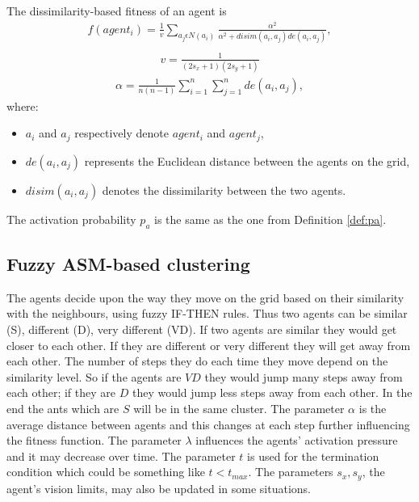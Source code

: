 \begin{definition}
\label{def:fitour}
The dissimilarity-based fitness of an agent is
\begin{align} 
f(agent_i)=\frac{1}{v} \sum_{a_j \epsilon N(a_i)} \frac{\alpha^2}{\alpha^2+ disim(a_i,a_j)de(a_i,a_j)},\\
 \end{align}
\begin{align}
v=\frac{1}{(2s_x + 1) (2s_y + 1)}
\end{align}
\begin{align}
\label{rel:alpha1}
\alpha=\frac{1}{n(n-1)} \sum_{i=1}^{n} \sum_{j=1}^{n} de(a_i,a_j),
\end{align}  
 where:
 \begin{itemize}
\item   $a_i$ and $a_j$ respectively denote $agent_i$ and $agent_j$,
\item $de(a_i,a_j) $  represents the Euclidean distance between the agents on the grid, 
\item $disim(a_i,a_j)$  denotes the dissimilarity between the two agents. 
\end{itemize}
\end{definition}

The activation probability $p_{a}$ is the same as the one from Definition \ref{def:pa}.


\subsection{Fuzzy ASM-based clustering}
\label{sec:fuzzyasmclustering}

The agents decide upon the way they move on the grid based on their similarity with the neighbours, using fuzzy IF-THEN rules. Thus two agents can be similar (S), different (D), very different (VD). If two agents are similar they would get closer to each other. If they are different or very different they will get away from each other. The number of steps they do each time they move depend on the similarity level. So if the agents are $VD$ they would jump many steps away from each other; if they are $D$ they would jump less steps away from each other. In the end the ants which are $S$ will be in the same cluster. The parameter $\alpha$ is the average distance  between agents and this changes at each step further influencing the fitness function. The parameter $\lambda$ influences the agents' activation pressure and it may decrease over time. The parameter $t$ is used for the  termination condition which could be something like \begin{math} t < t_{max}  \end{math}. The parameters $s_x, s_y$, the agent's vision limits, may also be updated in some situations.  

